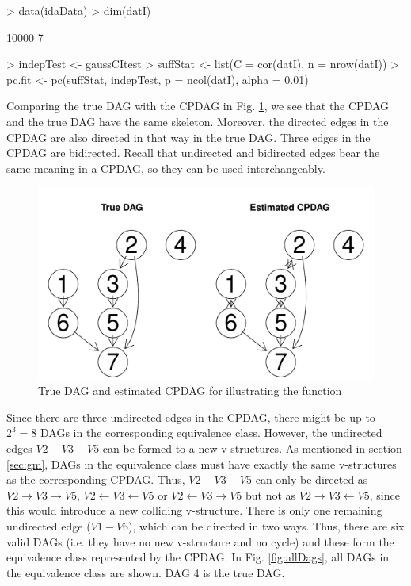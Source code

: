 \documentclass[article]{jss}
\begin{document}
\begin{Schunk}
\begin{Sinput}
> data(idaData)
> dim(datI)
\end{Sinput}
\begin{Soutput}
[1] 10000     7
\end{Soutput}
\begin{Sinput}
> indepTest <- gaussCItest 
> suffStat <- list(C = cor(datI), n = nrow(datI))
> pc.fit <- pc(suffStat, indepTest, p = ncol(datI), alpha = 0.01)
\end{Sinput}
\end{Schunk}

Comparing the true DAG with the CPDAG in Fig. \ref{fig:ida}, we see that
the CPDAG and the true DAG have the same skeleton. Moreover, the directed
edges in the CPDAG are also directed in that way in the true DAG. Three
edges in the CPDAG are bidirected. Recall that undirected and bidirected
edges bear the same meaning in a CPDAG, so they can be used interchangeably.
\begin{figure}
  \begin{center}
\includegraphics{pcalgDoc-idaExpl2}
\caption{True DAG and estimated CPDAG for illustrating the function }
\label{fig:ida}
\end{center}
\end{figure}

Since there are three undirected edges in the CPDAG, there might be up to
$2^3 = 8$ DAGs in the corresponding equivalence class. However, the
undirected edges $V2-V3-V5$ can be formed to a new v-structures. As
mentioned in section \ref{sec:gm}, DAGs in the equivalence class must have
exactly the same v-structures as the corresponding CPDAG. Thus, $V2-V3-V5$
can only be directed as $V2 \rightarrow V3 \rightarrow V5$, $V2 \leftarrow
V3 \leftarrow V5$ or $V2 \leftarrow V3 \rightarrow V5$ but not as $V2
\rightarrow V3 \leftarrow V5$, since this would introduce a new colliding
v-structure. There is only one remaining undirected edge ($V1-V6$), which
can be directed in two ways. Thus, there are six valid DAGs 
(i.e. they have no new v-structure and no cycle) and these form the
equivalence class represented by the CPDAG. In Fig. \ref{fig:allDags}, all
DAGs in the equivalence class are shown. DAG 4 is the true DAG.
\end{document}
